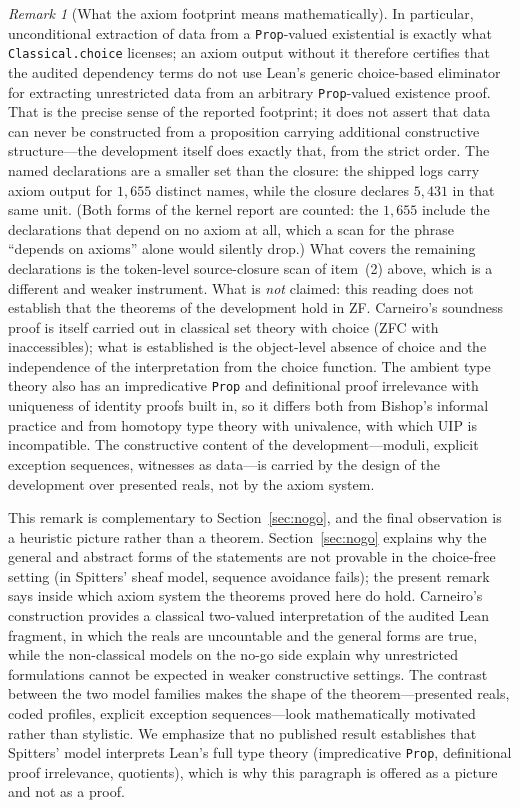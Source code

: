 \documentclass[11pt]{article}
\theoremstyle{definition}
\theoremstyle{remark}
\newtheorem{remark}[theorem]{Remark}
\begin{document}
\begin{remark}[What the axiom footprint means mathematically]
  In particular, unconditional extraction of data from a \texttt{Prop}-valued existential is exactly what \texttt{Classical.choice} licenses; an axiom output without it therefore certifies that the audited dependency terms do not use Lean's generic choice-based eliminator for extracting unrestricted data from an arbitrary \texttt{Prop}-valued existence proof.  That is the precise sense of the reported footprint; it does not assert that data can never be constructed from a proposition carrying additional constructive structure---the development itself does exactly that, from the strict order.  The named declarations are a smaller set than the closure: the shipped logs carry axiom output for $1{,}655$ distinct names, while the closure declares $5{,}431$ in that same unit.  (Both forms of the kernel report are counted: the $1{,}655$ include the declarations that depend on no axiom at all, which a scan for the phrase ``depends on axioms'' alone would silently drop.)  What covers the remaining declarations is the token-level source-closure scan of item~(2) above, which is a different and weaker instrument.
What is \emph{not} claimed: this reading does not establish that the theorems of the development hold in ZF.  Carneiro's soundness proof is itself carried out in classical set theory with choice (ZFC with inaccessibles); what is established is the object-level absence of choice and the independence of the interpretation from the choice function.  The ambient type theory also has an impredicative \texttt{Prop} and definitional proof irrelevance with uniqueness of identity proofs built in, so it differs both from Bishop's informal practice and from homotopy type theory with univalence, with which UIP is incompatible.  The constructive content of the development---moduli, explicit exception sequences, witnesses as data---is carried by the design of the development over presented reals, not by the axiom system.

This remark is complementary to Section~\ref{sec:nogo}, and the final observation is a heuristic picture rather than a theorem.  Section~\ref{sec:nogo} explains why the general and abstract forms of the statements are not provable in the choice-free setting (in Spitters' sheaf model, sequence avoidance fails); the present remark says inside which axiom system the theorems proved here do hold.  Carneiro's construction provides a classical two-valued interpretation of the audited Lean fragment, in which the reals are uncountable and the general forms are true, while the non-classical models on the no-go side explain why unrestricted formulations cannot be expected in weaker constructive settings. The contrast between the two model families makes the shape of the theorem---presented reals, coded profiles, explicit exception sequences---look mathematically motivated rather than stylistic.  We emphasize that no published result establishes that Spitters' model interprets Lean's full type theory (impredicative \texttt{Prop}, definitional proof irrelevance, quotients), which is why this paragraph is offered as a picture and not as a proof.
\end{remark}
\end{document}
